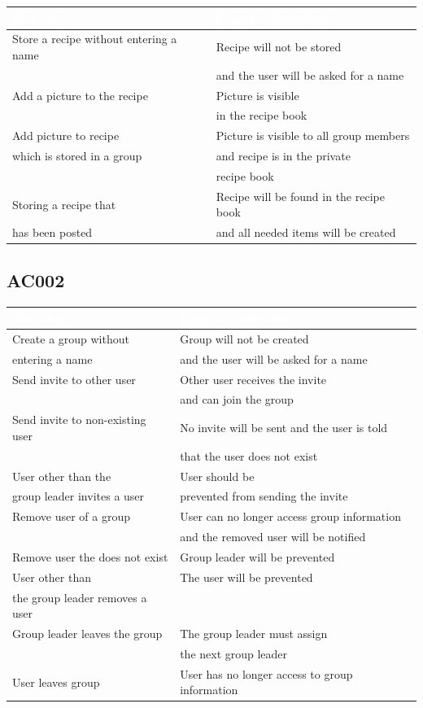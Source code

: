 \documentclass[12pt]{article}
\theoremstyle{definition}
\begin{document}
\begin{tabular}{|L{8cm}|L{8cm}|}
\hline 
{}\textcolor{white}{Test step} & \textcolor{white}{Expected behaviour} \\ \hline
Store a recipe without entering a name & Recipe will not be stored \\ 
 & and the user will be asked for a name \\ \hline
Add a picture to the recipe & Picture is visible \\
 & in the recipe book \\ \hline
Add picture to recipe & Picture is visible to all group members\\
which is stored in a group & and recipe is in the private \\ 
& recipe book \\ \hline
Storing a recipe that & Recipe will be found in the recipe book\\
has been posted & and all needed items will be created\\ \hline
\end{tabular}


\subsection{AC002}

\begin{tabular}{|L{8cm}|L{8cm}|}
\hline
{}\textcolor{white}{Test step} & \textcolor{white}{Expected behaviour} \\ \hline
Create a group without & Group will not be created\\
entering a name & and the user will be asked for a name \\ \hline 
Send invite to other user & Other user receives the invite \\
& and can join the group \\ \hline
Send invite to non-existing user & No invite will be sent and the user is told \\
& that the user does not exist \\ \hline
User other than the & User should be \\
group leader invites a user & prevented from sending the invite \\ \hline
Remove user of a group & User can no longer access group information \\
& and the removed user will be notified \\ \hline
Remove user the does not exist & Group leader will be prevented\\ \hline
User other than & The user will be prevented \\
the group leader removes a user & \\ \hline
Group leader leaves the group & The group leader must assign \\
& the next group leader \\ \hline
User leaves group & User has no longer access to group information \\ \hline
\end{tabular}
\end{document}
